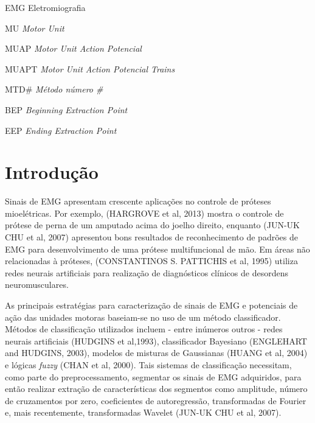 \documentclass[
	12pt,				%
	openright,			%
	oneside,
	a4paper,			%
	english,			%
	francais,			%
	spanish,			%
	brazil				%
	]{abntex2}
\begin{document}
\listoffigures*
\cleardoublepage

\listoftables*
\cleardoublepage

\begin{siglas}
  	\item[EMG]		Eletromiografia
	\item[MU]		\emph{Motor Unit}
  	\item[MUAP]		\emph{Motor Unit Action Potencial}
	\item[MUAPT]	\emph{Motor Unit Action Potencial Trains}
	\item[MTD\#]	\emph{Método número \#}
	\item[BEP]		\emph{Beginning Extraction Point}
	\item[EEP]		\emph{Ending Extraction Point}
\end{siglas}

\tableofcontents*
\cleardoublepage



\textual

\chapter{Introdução}

	Sinais de EMG apresentam crescente aplicações no controle de próteses mioelétricas. Por exemplo, (HARGROVE et al, 2013) mostra o controle de prótese de perna de um amputado acima do joelho direito, enquanto (JUN-UK CHU et al, 2007) apresentou bons resultados de reconhecimento de padrões de EMG para desenvolvimento de uma prótese multifuncional de mão. Em áreas não relacionadas à próteses, (CONSTANTINOS S. PATTICHIS et al, 1995) utiliza redes neurais artificiais para realização de diagnósticos clínicos de desordens neuromusculares.

	As principais estratégias para caracterização de sinais de EMG e potenciais de ação das unidades motoras baseiam-se no uso de um método classificador. Métodos de classificação utilizados incluem - entre inúmeros outros - redes neurais artificiais (HUDGINS et al,1993), classificador Bayesiano (ENGLEHART and HUDGINS, 2003), modelos de misturas de Gaussianas (HUANG et al, 2004) e lógicas \emph{fuzzy} (CHAN et al, 2000). Tais sistemas de classificação necessitam, como parte do preprocessamento, segmentar os sinais de EMG adquiridos, para então realizar extração de características dos segmentos como amplitude, número de cruzamentos por zero, coeficientes de autoregressão, transformadas de Fourier e, mais recentemente, transformadas Wavelet (JUN-UK CHU et al, 2007). 
\end{document}
